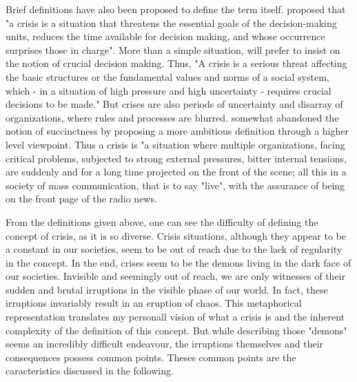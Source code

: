 Brief definitions have also been proposed to define the term itself.
\cite{hermannIssuesStudyInternational1972} proposed that "a crisis is a situation that threatens the essential goals of the decision-making units,
reduces the time available for decision making, and whose occurrence surprises those in charge".
More than a simple situation, \cite{rosenthalCrisisDecisionMakingNetherlands1986} will prefer to insist on the notion of crucial decision making.
Thus, "A crisis is a serious threat affecting the basic structures or the fundamental values and norms of a social system,
which - in a situation of high pressure and high uncertainty - requires crucial decisions to be made."
But crises are also periods of uncertainty and disarray of organizations, where rules and processes are blurred.
\cite{lagadecGESTIONCRISES1994} somewhat abandoned the notion of succinctness by proposing a more ambitious definition through a higher level viewpoint.
Thus a crisis is "a situation where multiple organizations, facing critical problems, subjected to strong external pressures, bitter internal tensions, are suddenly and for a long time projected on the front of the scene;
all this in a society of mass communication, that is to say "live", with the assurance of being on the front page of the radio news.

From the definitions given above, one can see the difficulty of defining the concept of crisis, as it is so diverse.
Crisis situations, although they appear to be a constant in our societies, seem to be out of reach due to the lack of regularity in the concept.
In the end, crises seem to be the demons living in the dark face of our societies.
Invisible and seemingly out of reach, we are only witnesses of their sudden and brutal irruptions in the visible phase of our world.
In fact, these irruptions invariably result in an eruption of chaos.
This metaphorical representation translates my personall vision of what a crisis is and the inherent complexity of the definition of this concept.
But while describing those "demons" seems an incredibly difficult endeavour, the irruptions themselves and their consequences possess common points.
Theses common points are the caracteristics discussed in the following.

